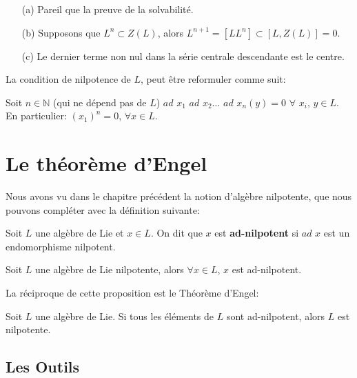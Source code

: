 \documentclass[a4paper,openany,12pt]{report}
\newcommand{\NN}{\mathbb{N}}
\theoremstyle{break}
{\theorembodyfont{\upshape}
\newtheorem*{rmq}{Remarque :}
\newtheorem*{prv}{Preuve :}
\newtheorem*{ex}{Exemples :}
\newtheorem*{exe}{Exemple : }
\newtheorem*{nota}{Notation :}
\newtheorem*{dem}{D\'emonstration :}}
\begin{document}
\begin{prv}
\begin{itemize}
\item[(a)]  Pareil que la preuve de la solvabilité.
\item[(b)]  Supposons que $L^n\subset Z(L)$, alors $L^{n+1}=[LL^n]\subset [L,Z(L)]=0$.
\item[(c)] Le dernier terme non nul dans la série centrale descendante est le centre.
\end{itemize}
\end{prv}

\begin{rmq}
La condition de nilpotence de $L$, peut être reformuler comme suit:

Soit $n \in \NN$ (qui ne dépend pas de $L$) $ad$ $x_{1}$ $ad$ $x_{2} \ldots$ $ad$ $x_{n}(y)=0$  $\forall$ $x_{i}$, $y \in L$.
En particulier:
$(x_{1})^n=0$, $\forall x \in L$.
\end{rmq}

\chapter{Le théorème d'Engel}

\quad Nous avons vu dans le chapitre précédent la notion d'algèbre nilpotente, que nous pouvons compléter avec la définition suivante:

\begin{df}
\quad Soit $L$ une algèbre de Lie et $x \in L$. On dit que $x$ est \textbf{ad-nilpotent} si $ad$ $x$ est un endomorphisme nilpotent. 
\end{df}

\begin{prop}\label{prop:E1}
\quad Soit $L$ une algèbre de Lie nilpotente, alors $\forall x \in L$, $x$ est ad-nilpotent.
\end{prop}


La réciproque de cette proposition est le Théorème d'Engel:

\begin{thm}\label{thm:engel}
\quad Soit $L$ une algèbre de Lie.
Si tous les éléments de $L$ sont ad-nilpotent, alors $L$ est nilpotente.
\end{thm}

\section{Les Outils}
\end{document}

